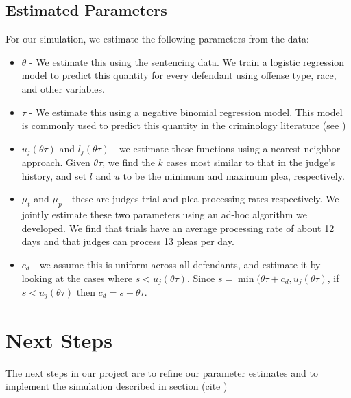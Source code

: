\documentclass[11pt]{article}
\begin{document}
  \subsection{Estimated Parameters}
    For our simulation, we estimate the following parameters from the data:
    \begin{itemize}
    \item $\theta$ - We estimate this using the sentencing data. We train a logistic regression model to predict this quantity for every defendant using offense type, race, and other variables.
    \item $\tau$ - We estimate this using a negative binomial regression model. This model is commonly used to predict this quantity in the criminology literature (see \cite{hester2017conditional})
    \item $u_j(\theta \tau)$ and $l_j(\theta \tau)$ - we estimate these functions using a nearest neighbor approach. Given $\theta \tau$, we find the $k$ cases most similar to that in the judge's history, and set $l$ and $u$ to be the minimum and maximum plea, respectively.
    \item $\mu_t$ and $\mu_p$ - these are judges trial and plea processing rates respectively. We jointly estimate these two parameters using an ad-hoc algorithm we developed. We find that trials have an average processing rate of about 12 days and that judges can process 13 pleas per day.
    \item $c_d$ - we assume this is uniform across all defendants, and estimate it by looking at the cases where $s < u_j(\theta \tau)$. Since $s = \min(\theta \tau + c_d, u_j(\theta \tau)$, if $s < u_j(\theta \tau)$ then $c_d = s - \theta \tau$.

    \end{itemize}

\section{Next Steps}
  The next steps in our project are to refine our parameter estimates and to implement the simulation described in section (cite )
\end{document}
